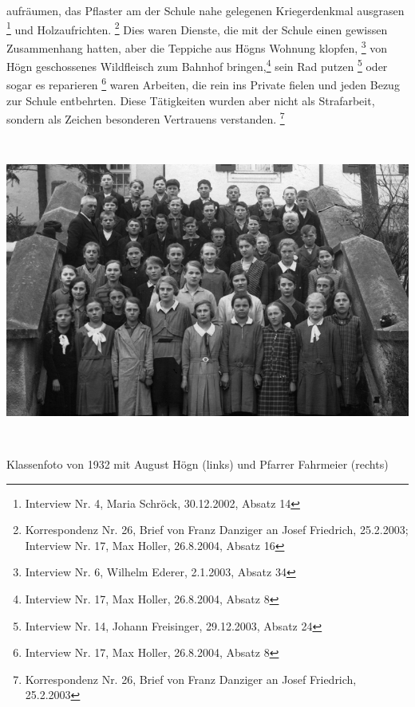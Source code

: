 aufräumen, das Pflaster am der Schule nahe gelegenen Kriegerdenkmal
ausgrasen \footnote{Interview Nr. 4, Maria Schröck, 30.12.2002, Absatz
14} und Holzaufrichten. \footnote{Korrespondenz Nr. 26, Brief von Franz
Danziger an Josef Friedrich, 25.2.2003; Interview Nr. 17, Max Holler,
26.8.2004, Absatz 16} Dies waren Dienste, die mit der Schule einen
gewissen Zusammenhang hatten, aber die Teppiche aus Högns Wohnung
klopfen, \footnote{Interview Nr. 6, Wilhelm Ederer, 2.1.2003, Absatz
34} von Högn geschossenes Wildfleisch zum Bahnhof bringen,\footnote{
Interview Nr. 17, Max Holler, 26.8.2004, Absatz 8} sein Rad
putzen \footnote{Interview Nr. 14, Johann Freisinger, 29.12.2003,
Absatz 24} oder sogar es reparieren \footnote{Interview Nr. 17, Max
Holler, 26.8.2004, Absatz 8} waren Arbeiten, die rein ins Private
fielen und jeden Bezug zur Schule entbehrten. Diese Tätigkeiten wurden
aber nicht als Strafarbeit, sondern als Zeichen besonderen Vertrauens
verstanden. \footnote{Korrespondenz Nr. 26, Brief von Franz Danziger an
Josef Friedrich, 25.2.2003}

{\centering
\includegraphics[width=16.044cm,height=10.081cm]{pictures/zulassungsarbeit-img031.jpg}
 \par}
Klassenfoto von 1932 mit August Högn
(links) und Pfarrer Fahrmeier (rechts)

